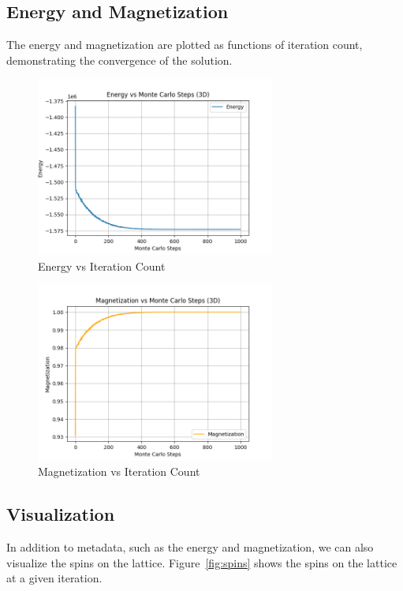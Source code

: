 \documentclass{article}
\begin{document}
\subsection{Energy and Magnetization}
The energy and magnetization are plotted as functions of iteration count, demonstrating the convergence of the solution.
\begin{figure}[H]
\centering
\includegraphics[width=0.7\textwidth]{energy_vs_steps.png}
\caption{Energy vs Iteration Count}
\label{fig:energy_vs_steps}
\end{figure}

\begin{figure}[H]
\centering
\includegraphics[width=0.7\textwidth]{magnetization_vs_steps.png}
\caption{Magnetization vs Iteration Count}
\label{fig:magnetization_vs_steps}
\end{figure}


\subsection{Visualization}
In addition to metadata, such as the energy and magnetization, we can also visualize the spins on the lattice. Figure~\ref{fig:spins} shows the spins on the lattice at a given iteration.
\end{document}

